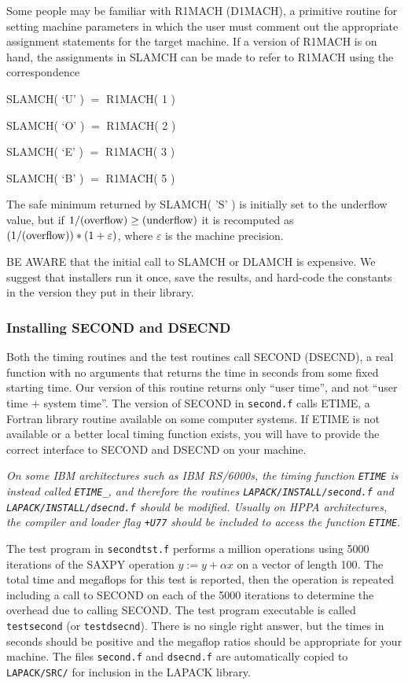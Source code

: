 Some people may be familiar with R1MACH (D1MACH), a primitive
routine for setting machine parameters in which the user must
comment out the appropriate assignment statements for the target
machine.  If a version of R1MACH is on hand, the assignments in
SLAMCH can be made to refer to R1MACH using the correspondence

\begin{list}{}{}
\item {SLAMCH( `U' )}  $=$ R1MACH( 1 )
\item {SLAMCH( `O' )}  $=$ R1MACH( 2 )
\item {SLAMCH( `E' )}  $=$ R1MACH( 3 )
\item {SLAMCH( `B' )}  $=$ R1MACH( 5 )
\end{list}

\noindent
The safe minimum returned by SLAMCH( 'S' ) is initially set to the
underflow value, but if $1/({\rm overflow}) \geq ({\rm underflow})$
it is recomputed as $(1/({\rm overflow})) * ( 1 + \varepsilon )$,
where $\varepsilon$ is the machine precision.

BE AWARE that the initial call to SLAMCH or DLAMCH is expensive.  
We suggest that installers run it once, save the results, and hard-code
the constants in the version they put in their library.

\subsubsection{Installing SECOND and DSECND}\label{second}
\dent
Both the timing routines and the test routines call SECOND
(DSECND), a real function with no arguments that returns the time
in seconds from some fixed starting time.
Our version of this routine returns only ``user time'', and
not ``user time $+$ system time''. 
The version of SECOND in {\tt second.f} calls ETIME, a Fortran library
routine available on some computer systems.
If ETIME is not available or a better local timing function exists,
you will have to provide the correct interface to SECOND and DSECND
on your machine.

{\em On some IBM architectures such as IBM RS/6000s, the timing function
{\tt ETIME} is instead called {\tt ETIME\_}, and therefore the routines
{\tt LAPACK/INSTALL/second.f} and {\tt LAPACK/INSTALL/dsecnd.f} should
be modified.  Usually on HPPA architectures,
the compiler and loader flag {\tt +U77} should be included to access
the function {\tt ETIME}}.

The test program in {\tt secondtst.f}
performs a million operations using 5000 iterations of 
the SAXPY operation $y := y + \alpha x$ on a vector of length 100.
The total time and megaflops for this test is reported, then
the operation is repeated including a call to SECOND on each of
the 5000 iterations to determine the overhead due to calling SECOND.
The test program executable is called {\tt testsecond} (or {\tt testdsecnd}).
There is no single right answer, but the times
in seconds should be positive and the megaflop ratios should be 
appropriate for your machine.
The files {\tt second.f} and {\tt dsecnd.f} are automatically copied to
{\tt LAPACK/SRC/} for inclusion in the LAPACK library.

